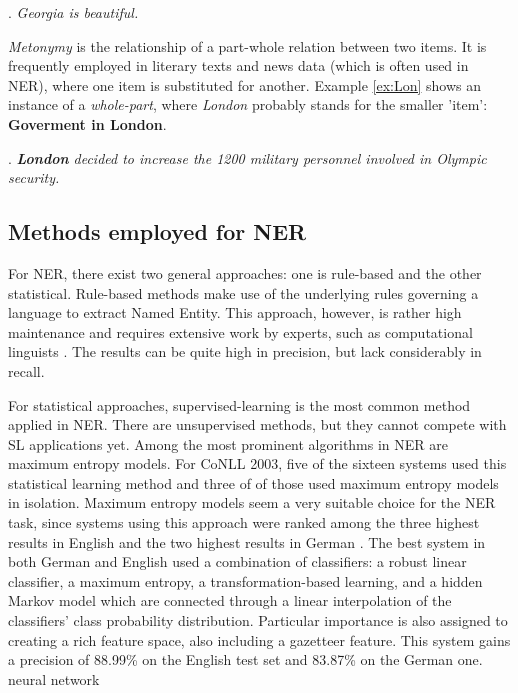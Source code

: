 \documentclass[11pt]{article}
\newcommand{\namedentity}{Named Entity}
\begin{document}
\ex. \emph{Georgia is beautiful.} \label{ex:Georgia}

\emph{Metonymy} is the relationship of a part-whole relation between two items.
It is frequently employed in literary texts and news data (which is often used in NER), where one item is substituted for another. 
Example \ref{ex:Lon} shows an instance of a \emph{whole-part}, where \emph{London} probably stands for the smaller 'item': \textbf{Goverment in London}. 

\ex. \emph{\textbf{London} decided to increase the 1200 military personnel involved in Olympic security.} \label{ex:Lon}

\subsection{Methods employed for NER}
For NER, there exist two general approaches: one is rule-based and the other statistical. 
Rule-based methods make use of the underlying rules governing a language to extract \namedentity. 
This approach, however, is rather high maintenance and requires extensive work by experts, such as computational linguists \cite{nadeau2007survey}.
The results can be quite high in precision, but lack considerably in recall. %

For statistical approaches, supervised-learning is the most common method applied in NER. 
There are unsupervised methods, but they cannot compete with SL applications yet.
Among the most prominent algorithms in NER are maximum entropy models. 
For CoNLL 2003, five of the sixteen systems used this statistical learning method and three of of those used maximum entropy models in isolation.
Maximum entropy models seem a very suitable choice for the NER task, since systems using this approach were ranked among the three highest results in 
English and the two highest results in German \cite{TjongKimSang:2003:ICS:1119176.1119195}.
The best system in both German and English \cite{Florian:2003:NER:1119176.1119201} used a combination of classifiers: a robust linear classifier, a maximum entropy, a transformation-based learning, and a hidden Markov model which are connected through a linear interpolation of the classifiers’ %
class probability distribution. Particular importance is also assigned to creating a rich feature space, also including a gazetteer feature. 
This system gains a precision of 88.99\% on the English test set and  83.87\% on the German one. 
neural network
\end{document}
